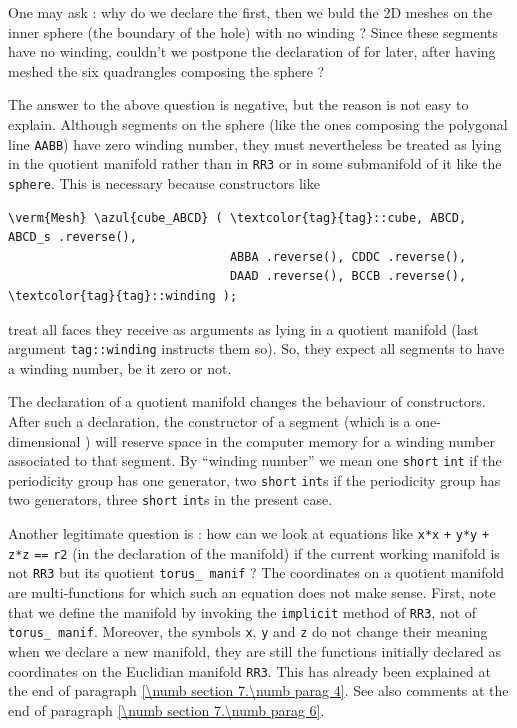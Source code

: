 One may ask : why do we declare the {\small\tt{}} {\small\tt{}} first,
then we buld the 2D meshes on the inner sphere (the boundary of the hole) with no winding ?
Since these segments have no winding, couldn't we postpone the declaration of
{\small\tt{}} for later, after having meshed the six quadrangles composing the sphere ?

The answer to the above question is negative, but the reason is not easy to explain.
Although segments on the sphere (like the ones composing the polygonal line {\small\tt AABB})
have zero winding number, they must nevertheless be treated as lying in the quotient manifold
rather than in {\small\tt RR3} or in some submanifold of it like the {\small\tt sphere}.
This is necessary because {\small\tt{}} constructors like

\begin{Verbatim}[commandchars=\\\{\},formatcom=\small\tt,
   baselinestretch=0.94,framesep=2mm                      ]
   \verm{Mesh} \azul{cube_ABCD} ( \textcolor{tag}{tag}::cube, ABCD, ABCD_s .reverse(),
                               ABBA .reverse(), CDDC .reverse(),
                               DAAD .reverse(), BCCB .reverse(), \textcolor{tag}{tag}::winding );
\end{Verbatim}

\noindent treat all faces they receive as arguments as lying in a quotient manifold
(last argument {\small\tt\textcolor{tag}{tag}::winding} instructs them so).
So, they expect all segments to have a winding number, be it zero or not.

The declaration of a quotient manifold changes the behaviour of {\small\tt{}} constructors.
After such a declaration, the constructor of a segment (which is a one-dimensional
{\small\tt{}}) will reserve space in the computer memory for a winding number
associated to that segment.
By ``winding number'' we mean one {\small\tt short} {\small\tt int} if the periodicity group
has one generator, two {\small\tt short} {\small\tt int}s if the periodicity group has two
generators, three {\small\tt short} {\small\tt int}s in the present case.

Another legitimate question is : how can we look at equations like {\small\tt x*x} {\small\tt +}
{\small\tt y*y} {\small\tt +} {\small\tt z*z} {\small\tt ==} {\small\tt r2}
(in the declaration of the {\small\tt{}} manifold) if the current working manifold
is not {\small\tt RR3} but its quotient {\small\tt torus\_\,manif} ?
The coordinates on a quotient manifold are multi-functions for which such an equation
does not make sense.
First, note that we define the {\small\tt{}} manifold by invoking the
{\small\tt implicit} method of {\small\tt RR3}, not of {\small\tt torus\_\,manif}.
Moreover, the symbols {\small\tt x}, {\small\tt y} and {\small\tt z} do not change their meaning
when we declare a new manifold, they are still the functions initially declared as coordinates
on the Euclidian manifold {\small\tt RR3}.
This has already been explained at the end of paragraph \ref{\numb section 7.\numb parag 4}.
See also comments at the end of paragraph \ref{\numb section 7.\numb parag 6}.

